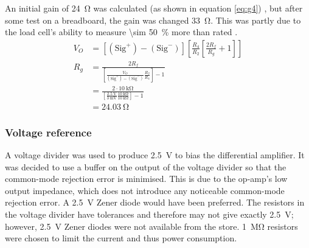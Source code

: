 \documentclass[twoside]{article}
\newcommand\ddfrac[2]{\frac{\displaystyle #1}{\displaystyle #2}}
\begin{document}
        An initial gain of \SI{24}{\ohm} was calculated (as shown in equation \eqref{eq:g4}) \cite{ti:sloa034}, but after some test on a breadboard, the gain was changed \SI{33}{\ohm}. This was partly due to the load cell's ability to measure \SI{\sim 50}{\percent} more than rated \cite{htc:tal221}.
        \begin{align}
            V_{O} &= \left[ \left(\text{Sig}^{+}\right) - \left(\text{Sig}^{-}\right)\right]\left[\frac{R_{4}}{R_{2}} \left[\frac{2R_{f}}{R_{g}} + 1\right] \right] \label{eq:g1}\\
            R_{g} &= \ddfrac{2R_{f}}{\left[\frac{V_{O}}{\left(\text{Sig}^{+}\right) - \left(\text{Sig}^{-}\right)} \frac{R_{2}}{R_{4}} \right]-1} \label{eq:g2}\\
            &= \ddfrac{2 \cdot \SI{10}{\kilo\ohm}}{\left[\frac{\SI{2.5}{\volt}}{\SI{3}{\milli\volt}} \frac{\SI{10}{\kilo\ohm}}{\SI{10}{\kilo\ohm}} \right]-1} \label{eq:g3}\\
            &= \SI{24.03}{\ohm} \label{eq:g4}
        \end{align}

        \subsubsection{Voltage reference}
        A voltage divider was used to produce \SI{2.5}{\volt} to bias the differential amplifier. It was decided to use a buffer on the output of the voltage divider so that the common-mode rejection error is minimised. This is due to the op-amp's low output impedance, which does not introduce any noticeable common-mode rejection error. A \SI{2.5}{\volt} Zener diode would have been preferred. The resistors in the voltage divider have tolerances and therefore may not give exactly \SI{2.5}{\volt}; however, \SI{2.5}{\volt} Zener diodes were not available from the store. \SI{1}{\mega\ohm} resistors were chosen to limit the current and thus power consumption.
\end{document}
